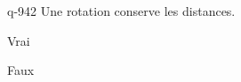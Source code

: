 \begin{truefalse}{q-942}
Une rotation conserve les distances.
\item* Vrai
\item Faux
\end{truefalse}

